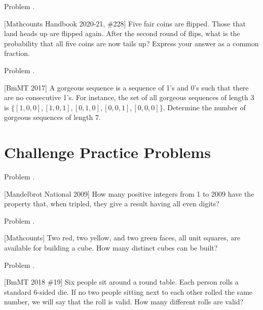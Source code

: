\documentclass[9pt]{beamer}
\newcounter{problem}[section]
\begin{document}
\begin{frame}[t, fragile]{Problem \thesection.\theproblem}
    \begin{block}{}[Mathcounts Handbook 2020-21, \#228]
     Five fair coins are flipped. Those that land heads up are flipped again. After the second round of flips, what is the probability that all five coins are now tails up? Express your answer as a common fraction. 
     
    \end{block}
\end{frame}

\begin{frame}[t, fragile]{Problem \thesection.\theproblem}
    \begin{block}{}[BmMT 2017]
    A gorgeous sequence is a sequence of 1’s and 0’s such that there are no consecutive 1’s. For
    instance, the set of all gorgeous sequences of length 3 is $ \{[1, 0, 0], [1, 0, 1], [0, 1, 0], [0, 0, 1], [0, 0, 0]\} . $
    Determine the number of gorgeous sequences of length 7.
    
    \end{block}
\end{frame}

\section{Challenge Practice Problems}
\begin{frame}[t, fragile]{Problem \thesection.\theproblem}
    \begin{block}{}[Mandelbrot National 2009]
    How many positive integers from 1 to 2009 have the property that, when tripled, they give a result having all even digits? 
    
    \end{block}
\end{frame}

\begin{frame}[t, fragile]{Problem \thesection.\theproblem}
    \begin{block}{}[Mathcounts]
     Two red, two yellow, and two green faces, all unit squares, are available for building a cube. How many distinct cubes can be built?
     
    \end{block}
\end{frame}

\begin{frame}[t, fragile]{Problem \thesection.\theproblem}
    \begin{block}{}[BmMT 2018 \#19]
Six people sit around a round table. Each person rolls a standard 6-sided die. If no two people sitting next to each other rolled the same number, we will say that the roll is valid. How many different rolls are valid?
	
    \end{block}
\end{frame}
\end{document}

